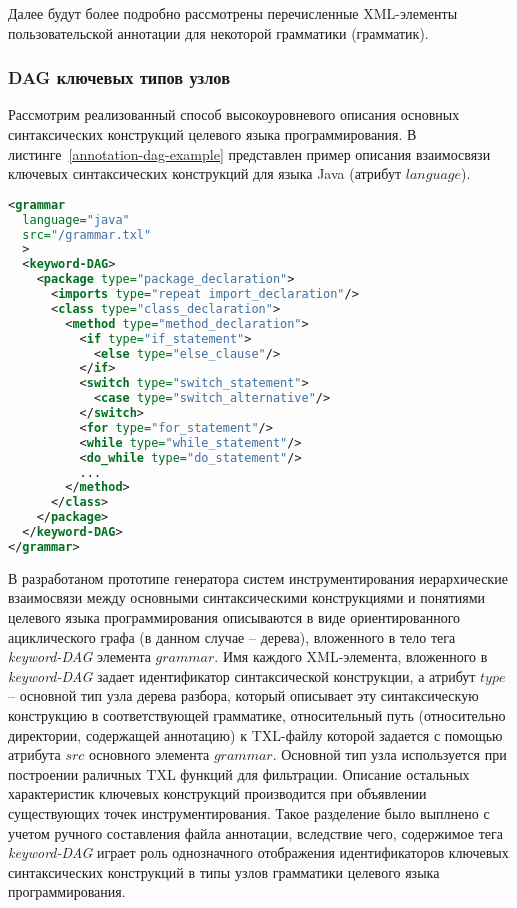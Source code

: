 
Далее будут более подробно рассмотрены перечисленные XML-элементы пользовательской аннотации для некоторой грамматики (грамматик).

\subsubsection{DAG ключевых типов узлов}

Рассмотрим реализованный способ высокоуровневого описания основных синтаксических конструкций целевого языка программирования.
В листинге~\ref{annotation-dag-example} представлен пример описания взаимосвязи ключевых синтаксических конструкций для языка Java (атрибут $language$).

\begin{lstlisting}[frame=single, language=XML, label={annotation-dag-example}, caption={Пример DAG для грамматики языка Java.}]
<grammar
  language="java"
  src="/grammar.txl"
  >
  <keyword-DAG>
    <package type="package_declaration">
      <imports type="repeat import_declaration"/>
      <class type="class_declaration">
        <method type="method_declaration">
          <if type="if_statement">
            <else type="else_clause"/>
          </if>
          <switch type="switch_statement">
            <case type="switch_alternative"/>
          </switch>
          <for type="for_statement"/>
          <while type="while_statement"/>
          <do_while type="do_statement"/>
          ...
        </method>
      </class>
    </package>
  </keyword-DAG>
</grammar>
\end{lstlisting}

В разработаном прототипе генератора систем инструментирования иерархические взаимосвязи между основными синтаксическими конструкциями и понятиями целевого языка программирования описываются в виде ориентированного ациклического графа (в данном случае -- дерева), вложенного в тело тега \textit{keyword-DAG} элемента $grammar$.
Имя каждого XML-элемента, вложенного в \textit{keyword-DAG} задает идентификатор синтаксической конструкции, а атрибут $type$ -- основной тип узла дерева разбора, который описывает эту синтаксическую конструкцию в соответствующей грамматике, относительный путь (относительно директории, содержащей аннотацию) к TXL-файлу которой задается с помощью атрибута $src$ основного элемента $grammar$.
Основной тип узла используется при построении раличных TXL функций для фильтрации.
Описание остальных характеристик ключевых конструкций производится при объявлении существующих точек инструментирования.
Такое разделение было выплнено с учетом ручного составления файла аннотации, вследствие чего, содержимое тега \textit{keyword-DAG} играет роль однозначного отображения идентификаторов ключевых синтаксических конструкций в типы узлов грамматики целевого языка программирования.

